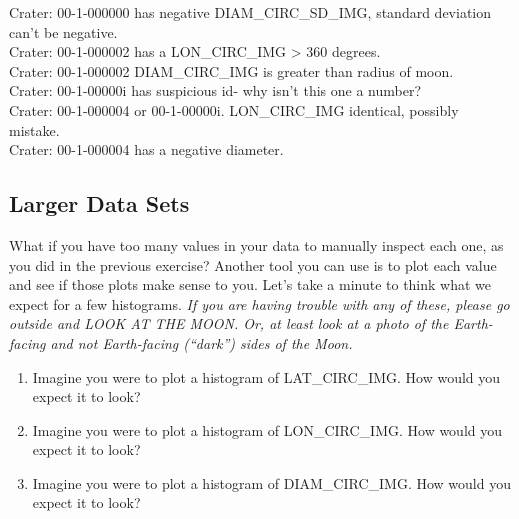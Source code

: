 \documentclass[Assignment5_Solutions]{subfiles}
\begin{document}
\begin{enumerate}[resume]
{Crater: 00-1-000000 has negative DIAM\_CIRC\_SD\_IMG, standard deviation can't be negative. \\
Crater: 00-1-000002 has a LON\_CIRC\_IMG > 360 degrees.\\
Crater: 00-1-000002 DIAM\_CIRC\_IMG is greater than radius of moon.\\
Crater: 00-1-00000i has suspicious id- why isn't this one a number?\\
Crater: 00-1-000004 or 00-1-00000i. LON\_CIRC\_IMG identical, possibly mistake.\\
Crater: 00-1-000004 has a negative diameter.\\}

\end{enumerate}

\subsection{Larger Data Sets}
What if you have too many values in your data to manually inspect each one, as you did in the previous exercise? Another tool you can use is to plot each value and see if those plots make sense to you. Let's take a minute to think what we expect for a few histograms. \emph{If you are having trouble with any of these, please go outside and LOOK AT THE MOON. Or, at least look at a photo of the Earth-facing and not Earth-facing (``dark'') sides of the Moon.}

\begin{enumerate}[resume]
\item Imagine you were to plot a histogram of LAT\_CIRC\_IMG. How would you expect it to look?
\item Imagine you were to plot a histogram of LON\_CIRC\_IMG. How would you expect it to look?
\item Imagine you were to plot a histogram of DIAM\_CIRC\_IMG. How would you expect it to look?
\end{enumerate}
\end{document}

